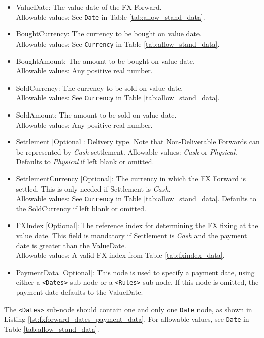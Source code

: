 \begin{itemize}
\item ValueDate: The value date of the FX Forward. \\ Allowable values:  See \lstinline!Date! in Table \ref{tab:allow_stand_data}.
\item BoughtCurrency: The currency to be bought on value date.  \\ Allowable values:  See \lstinline!Currency! in Table \ref{tab:allow_stand_data}.
\item BoughtAmount: The amount to be bought on value date.  \\ Allowable values:  Any positive real number.
\item SoldCurrency: The currency to be sold on value date.  \\ Allowable values:  See \lstinline!Currency! in Table \ref{tab:allow_stand_data}.
\item SoldAmount: The amount to be sold on value date.  \\ Allowable values:  Any positive real number.
\item Settlement [Optional]: Delivery type.  Note that Non-Deliverable Forwards can be represented by \emph{Cash} settlement.
Allowable values: \emph{Cash} or \emph{Physical}.  Defaults to \emph{Physical} if left blank or omitted.

\item SettlementCurrency [Optional]: The currency in which the FX Forward is settled. This is only needed if Settlement is \emph{Cash}. \\
Allowable values: See \lstinline!Currency! in Table \ref{tab:allow_stand_data}. Defaults to the SoldCurrency if left blank or omitted.

\item FXIndex [Optional]: The reference index for determining the FX fixing at the value date. This field is mandatory if Settlement is \emph{Cash}
and the payment date is greater than the ValueDate. \\
Allowable values: A valid FX index from Table \ref{tab:fxindex_data}.

\item PaymentData [Optional]: This node is used to specify a payment date, using either a \lstinline!<Dates>! sub-node or a \lstinline!<Rules>! sub-node. If this node is omitted, the payment date defaults to the ValueDate.
\end{itemize}

The \lstinline!<Dates>! sub-node should contain one and only one \lstinline!Date! node, as shown in Listing \ref{lst:fxforward_dates_payment_data}.
For allowable values, see \lstinline!Date! in Table \ref{tab:allow_stand_data}.

